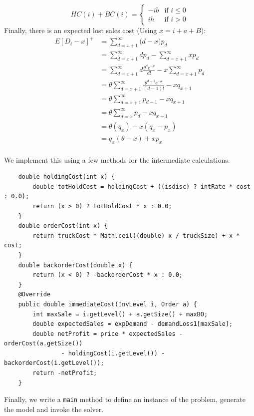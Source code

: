 \documentclass[11pt]{article}
\begin{document}
\begin{enumerate}
  \begin{equation*}HC(i)+BC(i)=\left\{
    \begin{array}{cc}
      -ib & \textrm{if $i \le 0$}\\
      ih & \textrm{if $i > 0$}
    \end{array} \right.
  \end{equation*}
  Finally, there is an expected lost sales cost (Using $x=i+a+B$):
    \begin{align*}
      E[D_t-x]^+ &= \sum_{d=x+1}^\infty \big(d-x\big)p_d \\
      &= \sum_{d=x+1}^\infty dp_d -\sum_{d=x+1}^\infty xp_d \\
      &= \sum_{d=x+1}^\infty d\frac{\theta^d e^{-\theta}}{d!} -x\sum_{d=x+1}^\infty p_d \\
      &= \theta\sum_{d=x+1}^\infty \frac{\theta^{d-1} e^{-\theta}}{(d-1)!} -xq_{x+1} \\
      &= \theta\sum_{d=x+1}^\infty {p_{d-1}} -xq_{x+1} \\
      &= \theta\sum_{d=x}^\infty {p_{d}} -xq_{x+1} \\
      &= \theta (q_{x}) -x(q_{x}-p_x) \\
      &= q_x(\theta-x) +xp_x \\
    \end{align*}
\end{enumerate}

We implement this using a few methods for the intermediate calculations.
  \begin{lstlisting}
    double holdingCost(int x) {
        double totHoldCost = holdingCost + ((isdisc) ? intRate * cost : 0.0);
        return (x > 0) ? totHoldCost * x : 0.0;
    } 
    double orderCost(int x) {
        return truckCost * Math.ceil((double) x / truckSize) + x * cost;
    } 
    double backorderCost(double x) {
        return (x < 0) ? -backorderCost * x : 0.0;
    }
    @Override
    public double immediateCost(InvLevel i, Order a) {
        int maxSale = i.getLevel() + a.getSize() + maxBO;
        double expectedSales = expDemand - demandLoss1[maxSale];
        double netProfit = price * expectedSales - orderCost(a.getSize())
                - holdingCost(i.getLevel()) - backorderCost(i.getLevel());
        return -netProfit;
    }
\end{lstlisting}

Finally, we write a \lstinline!main! method to define an instance of the problem, generate the model and invoke the solver.
\end{document}
